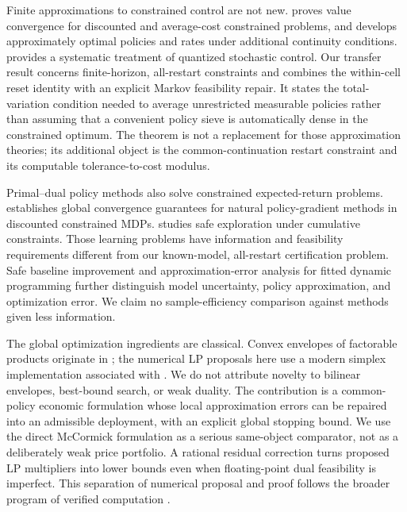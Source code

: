 Finite approximations to constrained control are not new. \citet{Saldi2018} proves value convergence for discounted and average-cost constrained problems, and develops approximately optimal policies and rates under additional continuity conditions. \citet{SaldiLinderYuksel2018} provides a systematic treatment of quantized stochastic control. Our transfer result concerns finite-horizon, all-restart constraints and combines the within-cell reset identity with an explicit Markov feasibility repair. It states the total-variation condition needed to average unrestricted measurable policies rather than assuming that a convenient policy sieve is automatically dense in the constrained optimum. The theorem is not a replacement for those approximation theories; its additional object is the common-continuation restart constraint and its computable tolerance-to-cost modulus.

Primal--dual policy methods also solve constrained expected-return problems. \citet{DingEtAl2020} establishes global convergence guarantees for natural policy-gradient methods in discounted constrained MDPs. \citet{NiKamgarpour2025} studies safe exploration under cumulative constraints. Those learning problems have information and feasibility requirements different from our known-model, all-restart certification problem. Safe baseline improvement \citep{Laroche2019} and approximation-error analysis for fitted dynamic programming \citep{MunosSzepesvari2008,Scherrer2013} further distinguish model uncertainty, policy approximation, and optimization error. We claim no sample-efficiency comparison against methods given less information.

The global optimization ingredients are classical. Convex envelopes of factorable products originate in \citet{McCormick1976}; the numerical LP proposals here use a modern simplex implementation associated with \citet{HuangfuHall2018}. We do not attribute novelty to bilinear envelopes, best-bound search, or weak duality. The contribution is a common-policy economic formulation whose local approximation errors can be repaired into an admissible deployment, with an explicit global stopping bound. We use the direct McCormick formulation as a serious same-object comparator, not as a deliberately weak price portfolio. A rational residual correction turns proposed LP multipliers into lower bounds even when floating-point dual feasibility is imperfect. This separation of numerical proposal and proof follows the broader program of verified computation \citep{Rump2010}.

